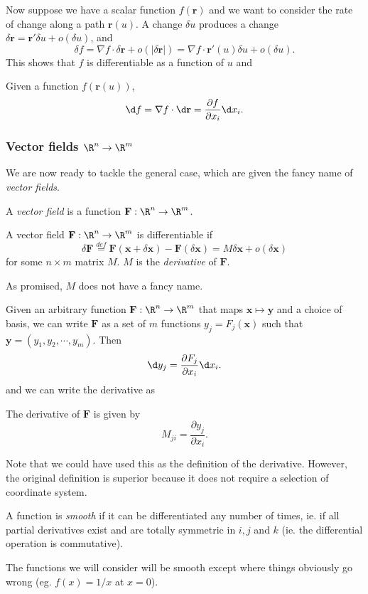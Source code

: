 \documentclass[a4paper]{article}
\begin{document}
Now suppose we have a scalar function $f(\mathbf{r})$ and we want to consider the rate of change along a path $\mathbf{r}(u)$. A change $\delta u$ produces a change $\delta \mathbf{r} = \mathbf{r}' \delta u + o(\delta u)$, and
\[
  \delta f = \nabla f\cdot \delta \mathbf{r} + o(|\delta \mathbf{r}|) = \nabla f\cdot \mathbf{r}'(u)\delta u + o(\delta u).
\]
This shows that $f$ is differentiable as a function of $u$ and
\begin{thm}
  Given a function $f(\mathbf{r}(u))$,
  \[
    \d f = \nabla f\cdot \d \mathbf{r} = \frac{\partial f}{\partial x_i} \d x_i.
  \]
\end{thm}

\subsubsection*{Vector fields \texorpdfstring{$\R^n\to \R^m$}{Rn to Rm}}
We are now ready to tackle the general case, which are given the fancy name of \emph{vector fields}.
\begin{defi}
  A \emph{vector field} is a function $\mathbf{F}: \R^n\to \R^m$.
\end{defi}

\begin{defi}
  A vector field $\mathbf{F}: \R^n \to \R^m$ is differentiable if
  \[
    \delta \mathbf{F} \stackrel{def}{=} \mathbf{F}(\mathbf{x} + \delta\mathbf{x}) - \mathbf{F}(\delta\mathbf{x}) = M\delta\mathbf{x} + o(\delta \mathbf{x})
  \]
  for some $n\times m$ matrix $M$. $M$ is the \emph{derivative} of $\mathbf{F}$.
\end{defi}
As promised, $M$ does not have a fancy name.

Given an arbitrary function $\mathbf{F}: \R^n \to \R^m$ that maps $\mathbf{x}\mapsto \mathbf{y}$ and a choice of basis, we can write $\mathbf{F}$ as a set of $m$ functions $y_j = F_j(\mathbf{x})$ such that $\mathbf{y} = (y_1, y_2, \cdots, y_m)$. Then
\[
  \d y_j = \frac{\partial F_j}{\partial x_i} \d x_i.
\]
and we can write the derivative as
\begin{thm}
  The derivative of $\mathbf{F}$ is given by
  \[
    M_{ji} =\frac{\partial y_j}{\partial x_i}.
  \]
\end{thm}
Note that we could have used this as the definition of the derivative. However, the original definition is superior because it does not require a selection of coordinate system.

\begin{defi}
  A function is \emph{smooth} if it can be differentiated any number of times, ie. if all partial derivatives exist and are totally symmetric in $i, j$ and $k$ (ie. the differential operation is commutative).
\end{defi}
The functions we will consider will be smooth except where things obviously go wrong (eg. $f(x) = 1/x$ at $x = 0$).
\end{document}
